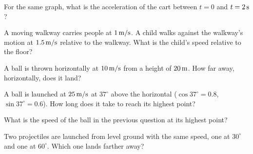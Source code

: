 \begin{exo}{}
For the same graph, what is the acceleration of the cart between $t=0$ and $t=2\,\mathrm{s}$?
\gVt
\choices{$3\mss$}{$6\mss$}{$2\mss$}{$12\mss$}
\end{exo}
\begin{exo}{}
A moving walkway carries people at $1\ms$. A child walks against the walkway's motion at $1.5\ms$ relative to the walkway. What is the child's speed relative to the floor?
\choices{$2.5\ms$}{$0.5\ms$}{$1.5\ms$}{$1\ms$}
\end{exo}
\begin{exo}{}
A ball is thrown horizontally at $10\,\mathrm{m/s}$ from a height of $20\m$. How far away, horizontally, does it land?
\choices{$10\m$}{$40\m$}{$20\m$}{$2\m$}
\end{exo}
\begin{exo}{}
A ball is launched at $25\,\mathrm{m/s}$ at $37^\circ$ above the horizontal ($\cos37^\circ=0.8$, $\sin37^\circ=0.6$). How long does it take to reach its highest point?
\choices{$1.5\s$}{$2\s$}{$2.5\s$}{$3\s$}
\end{exo}
\begin{exo}{}
What is the speed of the ball in the previous question at its highest point?
\end{exo}
\begin{exo}{}
Two projectiles are launched from level ground with the same speed, one at $30^\circ$ and one at $60^\circ$. Which one lands farther away?
\end{exo}
